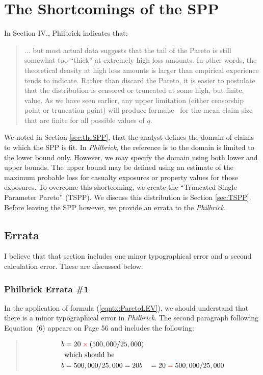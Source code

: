 \documentclass[]{article} %
\newcommand{\philbrick}{\textit{Philbrick}}
\begin{document}
\section{The Shortcomings of the SPP}

In Section IV., Philbrick indicates that:
\begin{quote}
	... but most actual data suggests that the tail of the Pareto is still somewhat too “thick” at extremely high loss amounts. In other words, the theoretical density at high loss amounts is larger than empirical experience tends to indicate. Rather than discard the Pareto, it is easier to postulate that the distribution is censored or truncated at some high, but finite, value. As we have seen earlier, any upper limitation (either censorship point or truncation point) will produce formul\ae~ for the mean claim size that are finite for all possible
	values of $q$. 
\end{quote}

We noted in Section \ref{sec:theSPP}, that the analyst defines the domain of claims to which the SPP is fit. In \philbrick, the reference is to the domain is limited to the lower bound only. However, we may specify the domain using both lower and upper bounds. The upper bound may be defined using an estimate of the maximum probable loss for casualty exposures or property values for those exposures. To overcome this shortcoming, we create the ``Truncated Single Parameter Pareto'' (TSPP). We discuss this distribution is Section \ref{sec:TSPP}. Before leaving the SPP however, we provide an errata to the \philbrick.

\subsection{Errata}
I believe that that section includes one minor typographical error and a second calculation error. These are discussed below.

\subsubsection{Philbrick Errata \#1}
	In the application of formula (\ref{eqntx:ParetoLEV}), we should understand that there is a minor typographical error in \philbrick. The second paragraph following Equation~(6) appears on Page 56 and includes the following:
	\begin{quote}
		\begin{align}
		b &= 20 \color{red}\times\color{black} (500,000/25,000)\nonumber\\
		&\text{which should be}\nonumber\\
		b &= 500,000/25,000 = 20\nonumber
		b &= 20 \color{red} = \color{black} 500,000/25,000\nonumber
		\end{align}
	\end{quote}
\end{document}
